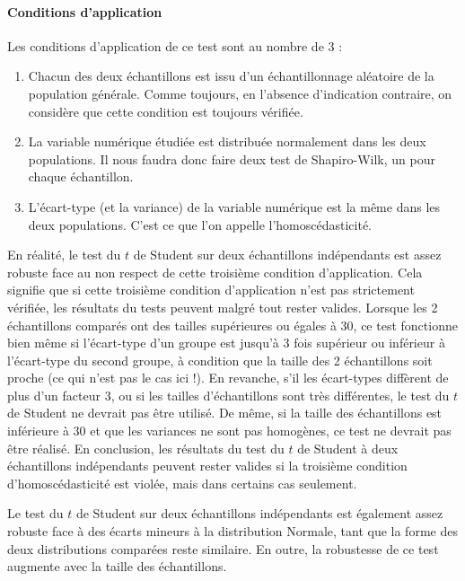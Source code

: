 \documentclass[a4paperpaper,]{article}
\providecommand{\tightlist}{%
  \setlength{\itemsep}{0pt}\setlength{\parskip}{0pt}}
\let\oldparagraph\paragraph
\renewcommand{\paragraph}[1]{\oldparagraph{#1}\mbox{}}
\begin{document}
\hypertarget{conditions-dapplication-2}{%
\paragraph{Conditions d'application}\label{conditions-dapplication-2}}

Les conditions d'application de ce test sont au nombre de 3 :

\begin{enumerate}
\def\labelenumi{\arabic{enumi}.}
\tightlist
\item
  Chacun des deux échantillons est issu d'un échantillonnage aléatoire de la population générale. Comme toujours, en l'absence d'indication contraire, on considère que cette condition est toujours vérifiée.
\item
  La variable numérique étudiée est distribuée normalement dans les deux populations. Il nous faudra donc faire deux test de Shapiro-Wilk, un pour chaque échantillon.
\item
  L'écart-type (et la variance) de la variable numérique est la même dans les deux populations. C'est ce que l'on appelle l'homoscédasticité.
\end{enumerate}

En réalité, le test du \(t\) de Student sur deux échantillons indépendants est assez robuste face au non respect de cette troisième condition d'application. Cela signifie que si cette troisième condition d'application n'est pas strictement vérifiée, les résultats du tests peuvent malgré tout rester valides. Lorsque les 2 échantillons comparés ont des tailles supérieures ou égales à 30, ce test fonctionne bien même si l'écart-type d'un groupe est jusqu'à 3 fois supérieur ou inférieur à l'écart-type du second groupe, à condition que la taille des 2 échantillons soit proche (ce qui n'est pas le cas ici !). En revanche, s'il les écart-types diffèrent de plus d'un facteur 3, ou si les tailles d'échantillons sont très différentes, le test du \(t\) de Student ne devrait pas être utilisé. De même, si la taille des échantillons est inférieure à 30 et que les variances ne sont pas homogènes, ce test ne devrait pas être réalisé. En conclusion, les résultats du test du \(t\) de Student à deux échantillons indépendants peuvent rester valides si la troisième condition d'homoscédasticité est violée, mais dans certains cas seulement.

Le test du \(t\) de Student sur deux échantillons indépendants est également assez robuste face à des écarts mineurs à la distribution Normale, tant que la forme des deux distributions comparées reste similaire. En outre, la robustesse de ce test augmente avec la taille des échantillons.
\end{document}
